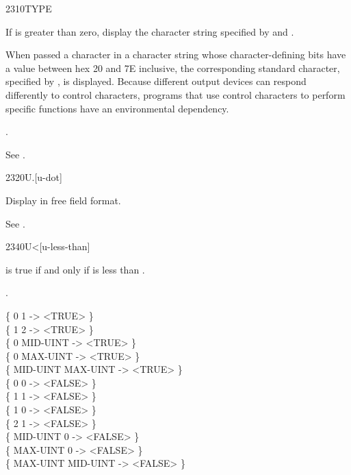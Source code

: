 \begin{worddef}{2310}{TYPE}
\item {}

	If  is greater than zero, display the character string
	specified by  and .

	When passed a character in a character string whose
	character-defining bits have a value between hex 20 and 7E
	inclusive, the corresponding standard character, specified
	by , is displayed.
	Because different output devices can respond differently to
	control characters, programs that use control characters to
	perform specific functions have an environmental dependency.

\see {}.

	\begin{defer}
	\testing*
		See .
	\end{defer}
\end{worddef}


\begin{worddef}[Ud]{2320}{U.{}}[u-dot]
\item {}

	Display  in free field format.

	\begin{defer}
	\testing*
		See \rref{core:EMIT}{EMIT}.
	\end{defer}
\end{worddef}


\begin{worddef}[Uless]{2340}{U<}[u-less-than]
\item {}

	 is true if and only if  is less than
	\param{u_2}.

\see {}.

	\begin{defer}
	\testing
		\{        0        1  -> <TRUE>  \} \\
		\{        1        2  -> <TRUE>  \} \\
		\{        0 MID-UINT  -> <TRUE>  \} \\
		\{        0 MAX-UINT  -> <TRUE>  \} \\
		\{ MID-UINT MAX-UINT  -> <TRUE>  \} \\
		\{        0        0  -> <FALSE> \} \\
		\{        1        1  -> <FALSE> \} \\
		\{        1        0  -> <FALSE> \} \\
		\{        2        1  -> <FALSE> \} \\
		\{ MID-UINT        0  -> <FALSE> \} \\
		\{ MAX-UINT        0  -> <FALSE> \} \\
		\{ MAX-UINT MID-UINT  -> <FALSE> \}
	\end{defer}
\end{worddef}


